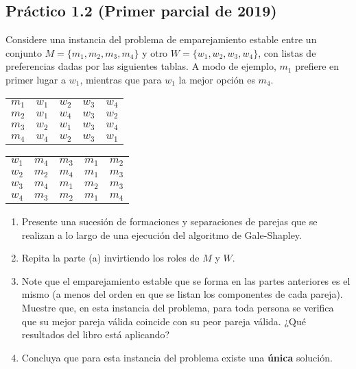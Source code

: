 \documentclass{article}
\begin{document}
\newpage

\subsection{Práctico 1.2 (Primer parcial de 2019)} Considere una instancia del problema de emparejamiento estable entre un conjunto $M = \{m_1, m_2, m_3, m_4\}$ y otro $W = \{w_1, w_2, w_3, w_4\}$, con listas de preferencias dadas por las siguientes tablas. A modo de ejemplo, $m_1$ prefiere en primer lugar a $w_1$, mientras que para $w_1$ la mejor opción es $m_4$.

\begin{center}
\begin{minipage}{0.45\textwidth}
\centering
\begin{tabular}{ |c||c|c|c|c| } 
 \hline
 $m_1$ & $w_1$ & $w_2$ & $w_3$ & $w_4$\\ 
 $m_2$ & $w_1$ & $w_4$ & $w_3$ & $w_2$\\ 
 $m_3$ & $w_2$ & $w_1$ & $w_3$ & $w_4$\\ 
 $m_4$ & $w_4$ & $w_2$ & $w_3$ & $w_1$\\
 \hline
\end{tabular}
\end{minipage}
\hfill
\begin{minipage}{0.45\textwidth}
\centering
\begin{tabular}{ |c||c|c|c|c| } 
 \hline
 $w_1$ & $m_4$ & $m_3$ & $m_1$ & $m_2$\\ 
 $w_2$ & $m_2$ & $m_4$ & $m_1$ & $m_3$\\ 
 $w_3$ & $m_4$ & $m_1$ & $m_2$ & $m_3$\\ 
 $w_4$ & $m_3$ & $m_2$ & $m_1$ & $m_4$\\
 \hline
\end{tabular}
\end{minipage}
\end{center}

\begin{enumerate}[label=\alph*)]
    \item Presente una sucesión de formaciones y separaciones de parejas que se realizan a lo largo de una ejecución del algoritmo de Gale-Shapley.
    \item Repita la parte (a) invirtiendo los roles de $M$ y $W$.
    \item Note que el emparejamiento estable que se forma en las partes anteriores es el mismo (a menos del orden en que se listan los componentes de cada pareja). Muestre que, en esta instancia del problema, para toda persona se verifica que su mejor pareja válida coincide con su peor pareja válida. ¿Qué resultados del libro está aplicando?
    \item Concluya que para esta instancia del problema existe una \textbf{única} solución.
\end{enumerate}
\end{document}
